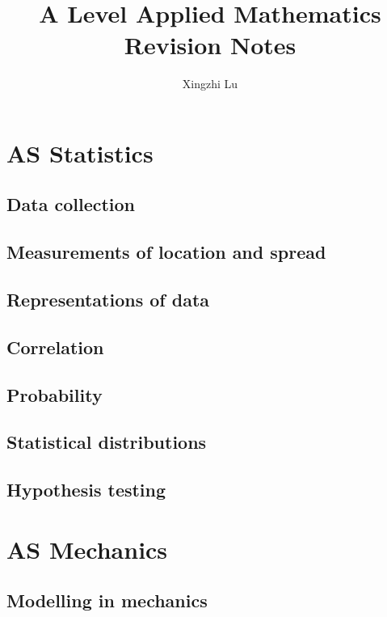 \documentclass[oneside,fleqn,11pt]{book}
\title{A Level Applied Mathematics Revision Notes}
\author{Xingzhi Lu}
\date{}
\begin{document}
\maketitle
\everymath{\displaystyle}

\tableofcontents

\part{AS Statistics}
\chapter{Data collection}


\chapter{Measurements of location and spread}


\chapter{Representations of data}


\chapter{Correlation}


\chapter{Probability}


\chapter{Statistical distributions}


\chapter{Hypothesis testing}


\part{AS Mechanics}
\setcounter{chapter}{7}
\chapter{Modelling in mechanics}

\end{document}
